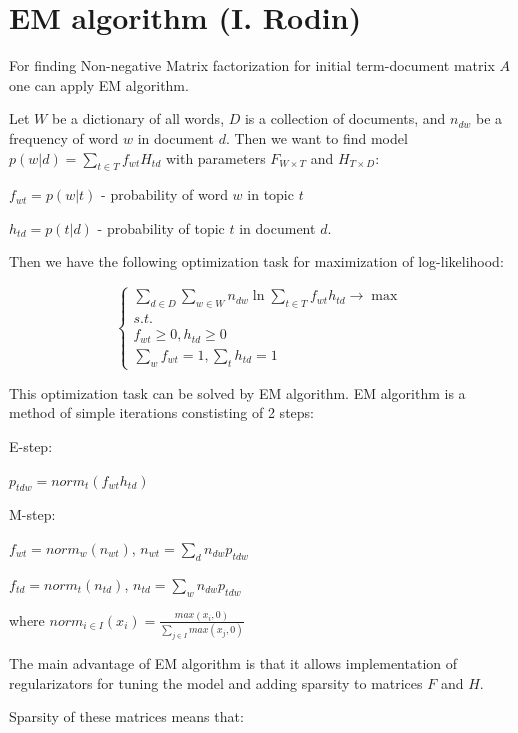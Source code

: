 \documentclass[a4paper]{article}
\begin{document}
\clearpage

\section*{EM algorithm (I. Rodin)}

For finding Non-negative Matrix factorization for initial term-document matrix $A$ one can apply EM algorithm.

Let $W$ be a dictionary of all words, $D$ is a collection of documents, and $n_{dw}$ be a frequency of word $w$ in document $d$. Then we want to find model $p(w|d) = \sum_{t\in T}f_{wt}H_{td}$ with parameters $F_{W\times T}$ and $H_{T\times D}$:

$f_{wt} = p(w|t)$ - probability of word $w$ in topic $t$

$h_{td} = p(t|d)$ - probability of topic $t$ in document $d$.

Then we have the following optimization task for maximization of log-likelihood:

$$\begin{cases}
\sum_{d\in D}\sum_{w\in W}n_{dw}\ln\sum_{t\in T}f_{wt}h_{td} \rightarrow \max\\

s.t.\\

f_{wt}\geq 0, h_{td}\geq 0\\

\sum_wf_{wt} = 1, \sum_th_{td} = 1
\end{cases}$$

This optimization task can be solved by EM algorithm. EM algorithm is a method of simple iterations constisting of 2 steps:

E-step:

$p_{tdw} = norm_{t}(f_{wt}h_{td})$

M-step:

$f_{wt} = norm_{w}(n_{wt})$, $n_{wt} = \sum_dn_{dw}p_{tdw}$

$f_{td} = norm_t(n_{td})$, $n_{td} = \sum_wn_{dw}p_{tdw}$

where $norm_{i\in I}(x_i) = \frac{max(x_i, 0)}{\sum_{j\in I}max(x_j,0)}$

The main advantage of EM algorithm is that it allows implementation of regularizators for tuning the model and adding sparsity to matrices $F$ and $H$.

Sparsity of these matrices means that:
\end{document}
